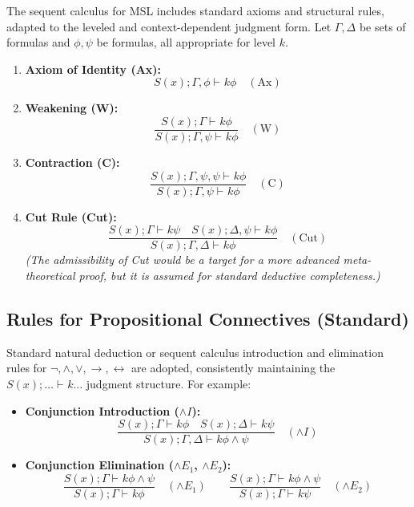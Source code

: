 \documentclass[
    12pt,              %
    a4paper,           %
    headings=normal,   %
    twoside=true,      %
    BCOR=8mm,          %
]{scrbook}
\newcommand{\turnstilek}[1][]{\vdash^{#1}}
\begin{document}
The sequent calculus for MSL includes standard axioms and structural rules, adapted to the leveled and context-dependent judgment form. Let \(\Gamma, \Delta\) be sets of formulas and \(\phi, \psi\) be formulas, all appropriate for level \(k\).

\begin{enumerate}[label=\arabic*.]
    \item  \textbf{Axiom of Identity (Ax):}
    \[ S(x); \Gamma, \phi \turnstilek{k} \phi \quad (\text{Ax}) \]

    \item  \textbf{Weakening (W):}
    \[ \frac{S(x); \Gamma \turnstilek{k} \phi}{S(x); \Gamma, \psi \turnstilek{k} \phi} \quad (\text{W}) \]

    \item  \textbf{Contraction (C):}
    \[ \frac{S(x); \Gamma, \psi, \psi \turnstilek{k} \phi}{S(x); \Gamma, \psi \turnstilek{k} \phi} \quad (\text{C}) \]

    \item  \textbf{Cut Rule (Cut):}
    \[ \frac{S(x); \Gamma \turnstilek{k} \psi \quad S(x); \Delta, \psi \turnstilek{k} \phi}{S(x); \Gamma, \Delta \turnstilek{k} \phi} \quad (\text{Cut}) \]
    \textit{(The admissibility of Cut would be a target for a more advanced meta-theoretical proof, but it is assumed for standard deductive completeness.)}
\end{enumerate}

\subsection*{Rules for Propositional Connectives (Standard)}

Standard natural deduction or sequent calculus introduction and elimination rules for \(\neg, \land, \lor, \rightarrow, \leftrightarrow\) are adopted, consistently maintaining the \(S(x); \ldots \turnstilek{k} \ldots\) judgment structure. For example:

\begin{itemize}
    \item   \textbf{Conjunction Introduction (\(\land I\)):}
    \[ \frac{S(x); \Gamma \turnstilek{k} \phi \quad S(x); \Delta \turnstilek{k} \psi}{S(x); \Gamma, \Delta \turnstilek{k} \phi \land \psi} \quad (\land I) \]
    \item   \textbf{Conjunction Elimination (\(\land E_1\), \(\land E_2\)):}
    \[ \frac{S(x); \Gamma \turnstilek{k} \phi \land \psi}{S(x); \Gamma \turnstilek{k} \phi} \quad (\land E_1) \qquad
       \frac{S(x); \Gamma \turnstilek{k} \phi \land \psi}{S(x); \Gamma \turnstilek{k} \psi} \quad (\land E_2)
    \]
\end{itemize}
\end{document}
